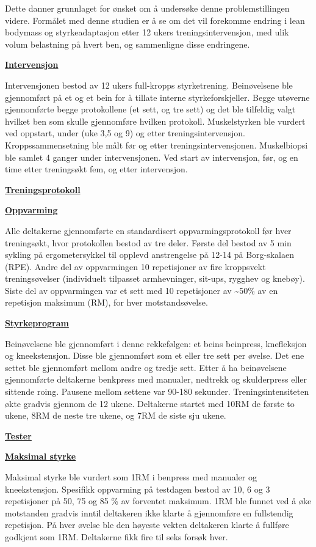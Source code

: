 \documentclass[
]{book}
\begin{document}
Dette danner grunnlaget for ønsket om å undersøke denne
problemstillingen videre. Formålet med denne studien er å se om det vil
forekomme endring i lean bodymass og styrkeadaptasjon etter 12 ukers
treningsintervensjon, med ulik volum belastning på hvert ben, og
sammenligne disse endringene.

\underline{\textbf{Intervensjon}}

Intervensjonen bestod av 12 ukers full-kropps styrketrening.
Beinøvelsene ble gjennomført på et og et bein for å tillate interne
styrkeforskjeller. Begge utøverne gjennomførte begge protokollene (et
sett, og tre sett) og det ble tilfeldig valgt hvilket ben som skulle
gjennomføre hvilken protokoll. Muskelstyrken ble vurdert ved oppstart,
under (uke 3,5 og 9) og etter treningsintervensjon. Kroppssammensetning
ble målt før og etter treningsintervensjonen. Muskelbiopsi ble samlet 4
ganger under intervensjonen. Ved start av intervensjon, før, og en time
etter treningsøkt fem, og etter intervensjon.

\underline{\textbf{Treningsprotokoll}}

\underline{\textbf{Oppvarming}}

Alle deltakerne gjennomførte en standardisert oppvarmingsprotokoll før
hver treningsøkt, hvor protokollen bestod av tre deler. Første del
bestod av 5 min sykling på ergometersykkel til opplevd anstrengelse på
12-14 på Borg-skalaen (RPE). Andre del av oppvarmingen 10 repetisjoner
av fire kroppsvekt treningsøvelser (individuelt tilpasset armhevninger,
sit-ups, rygghev og knebøy). Siste del av oppvarmingen var et sett med
10 repetisjoner av \textasciitilde50\% av en repetisjon maksimum (RM),
for hver motstandsøvelse.

\underline{\textbf{Styrkeprogram}}

Beinøvelsene ble gjennomført i denne rekkefølgen: et beins beinpress,
knefleksjon og kneekstensjon. Disse ble gjennomført som et eller tre
sett per øvelse. Det ene settet ble gjennomført mellom andre og tredje
sett. Etter å ha beinøvelsene gjennomførte deltakerne benkpress med
manualer, nedtrekk og skulderpress eller sittende roing. Pausene mellom
settene var 90-180 sekunder. Treningsintensiteten økte gradvis gjennom
de 12 ukene. Deltakerne startet med 10RM de første to ukene, 8RM de
neste tre ukene, og 7RM de siste sju ukene.

\underline{\textbf{Tester}}

\underline{\textbf{Maksimal styrke}}

Maksimal styrke ble vurdert som 1RM i benpress med manualer og
kneekstensjon. Spesifikk oppvarming på testdagen bestod av 10, 6 og 3
repetisjoner på 50, 75 og 85 \% av forventet maksimum. 1RM ble funnet
ved å øke motstanden gradvis inntil deltakeren ikke klarte å gjennomføre
en fullstendig repetisjon. På hver øvelse ble den høyeste vekten
deltakeren klarte å fullføre godkjent som 1RM. Deltakerne fikk fire til
seks forsøk hver.
\end{document}

